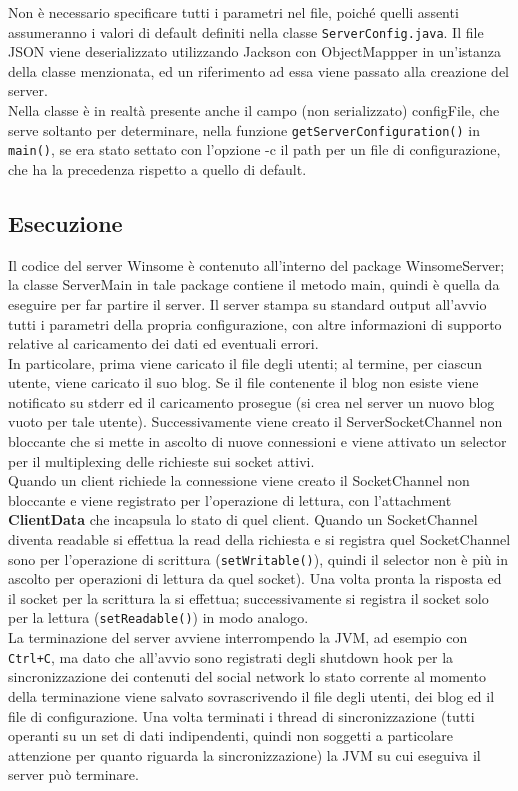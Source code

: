 Non è necessario specificare tutti i parametri nel file, poiché quelli assenti assumeranno i valori di default definiti nella classe \verb|ServerConfig.java|. Il file JSON viene deserializzato utilizzando Jackson con ObjectMappper in un'istanza della classe menzionata, ed un riferimento ad essa viene passato alla creazione del server.\\
Nella classe è in realtà presente anche il campo (non serializzato) configFile, che serve soltanto per determinare, nella funzione \verb|getServerConfiguration()| in \verb|main()|, se era stato settato con l'opzione -c il path per un file di configurazione, che ha la precedenza rispetto a quello di default.

\subsection{Esecuzione}
Il codice del server Winsome è contenuto all'interno del package WinsomeServer; la classe ServerMain in tale package contiene il metodo main, quindi è quella da eseguire per far partire il server. Il server stampa su standard output all'avvio tutti i parametri della propria configurazione, con altre informazioni di supporto relative al caricamento
dei dati ed eventuali errori.\\
In particolare, prima viene caricato il file degli utenti; al termine, per ciascun utente, viene caricato il suo blog. Se il file contenente il blog 
non esiste viene notificato su stderr ed il caricamento prosegue (si crea nel server un nuovo blog vuoto per tale utente). Successivamente viene creato il ServerSocketChannel
non bloccante che si mette in ascolto di nuove connessioni e viene attivato un selector per il multiplexing delle richieste sui socket attivi.\\
Quando un client richiede la connessione viene creato il SocketChannel non bloccante e viene registrato per l'operazione di lettura, con l'attachment \textbf{ClientData} che incapsula lo stato di quel client. Quando un SocketChannel diventa readable si effettua la read della richiesta e si registra quel SocketChannel sono per l'operazione di scrittura (\verb|setWritable()|), quindi il selector non è più in
ascolto per operazioni di lettura da quel socket). Una volta pronta la risposta ed il socket per la scrittura la si effettua; successivamente si registra il socket solo per la lettura (\verb|setReadable()|) in modo analogo.\\
La terminazione del server avviene interrompendo la JVM, ad esempio con \verb|Ctrl+C|, ma  dato che all'avvio sono registrati degli shutdown hook per la sincronizzazione dei contenuti del social network lo stato corrente al momento della terminazione viene salvato sovrascrivendo il file degli utenti, dei blog ed il file di configurazione. Una volta terminati i thread di sincronizzazione (tutti operanti su un set di dati indipendenti, quindi non soggetti a particolare attenzione per quanto riguarda la sincronizzazione) la JVM su cui eseguiva il server può terminare.

